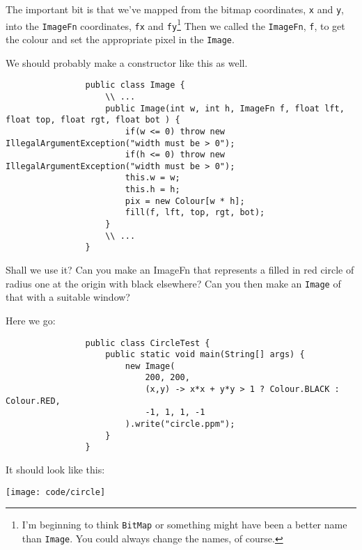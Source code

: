 \documentclass{article}
\begin{document}
            The important bit is that we've mapped from the bitmap coordinates, \texttt{x} and \texttt{y}, into the \texttt{ImageFn}
            coordinates, \texttt{fx} and \texttt{fy}\footnote{I'm beginning to think \texttt{BitMap} or something might have been a better
            name than \texttt{Image}. You could always change the names, of course.} Then we called the \texttt{ImageFn}, \texttt{f}, to
            get the colour and set the appropriate pixel in the \texttt{Image}.
            
            We should probably make a constructor like this as well.

            \begin{verbatim}
                public class Image {
                    \\ ...
                    public Image(int w, int h, ImageFn f, float lft, float top, float rgt, float bot ) {
                        if(w <= 0) throw new IllegalArgumentException("width must be > 0");
                        if(h <= 0) throw new IllegalArgumentException("width must be > 0");
                        this.w = w;
                        this.h = h;
                        pix = new Colour[w * h];
                        fill(f, lft, top, rgt, bot);
                    }
                    \\ ...
                }
            \end{verbatim}
            
            Shall we use it? Can you make an ImageFn that represents a filled in red circle of radius one at the origin with black
            elsewhere? Can you then make an \texttt{Image} of that with a suitable window?
            
            Here we go:
            
            \begin{verbatim}
                public class CircleTest {
                    public static void main(String[] args) {
                        new Image(
                            200, 200,
                            (x,y) -> x*x + y*y > 1 ? Colour.BLACK : Colour.RED,
                            -1, 1, 1, -1 
                        ).write("circle.ppm");
                    }
                }
            \end{verbatim}
            
            It should look like this:
            
            \texttt{[image: code/circle]}
            
\end{document}
